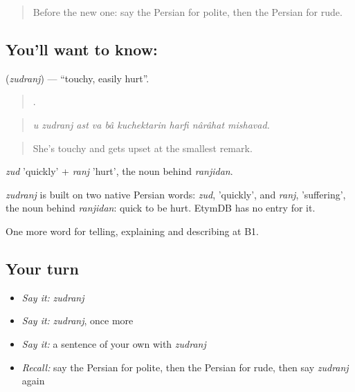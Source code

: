 \label{lesson:FA-C489-zudranj}



\begin{quote}
Before the new one: say the Persian for polite, then the Persian for rude.
\end{quote}

\subsection*{You'll want to know: }
\textbf{} (\emph{zudranj}) — \textquotedblleft{}touchy, easily hurt\textquotedblright{}.

\begin{quote}
        .
\end{quote}

\begin{quote}
\emph{u zudranj ast va bâ kuchektarin harfi nârâhat mishavad.}
\end{quote}

\begin{quote}
She's touchy and gets upset at the smallest remark.
\end{quote}

\emph{zud} 'quickly' + \emph{ranj} 'hurt', the noun behind \emph{ranjidan}.

\begin{cousinweb}
\emph{zudranj} is built on two native Persian words: \emph{zud}, 'quickly', and \emph{ranj}, 'suffering', the noun behind \emph{ranjidan}: quick to be hurt. EtymDB has no entry for it.
\end{cousinweb}

\begin{grammarlens}[title={What you've built}]
One more word for telling, explaining and describing at B1.
\end{grammarlens}

\subsection*{Your turn}
\begin{itemize}
\raggedright
  \item \emph{Say it:} \emph{zudranj}
  \item \emph{Say it:} \emph{zudranj}, once more
  \item \emph{Say it:} a sentence of your own with \emph{zudranj}
  \item \emph{Recall:} say the Persian for polite, then the Persian for rude, then say \emph{zudranj} again
\end{itemize}


